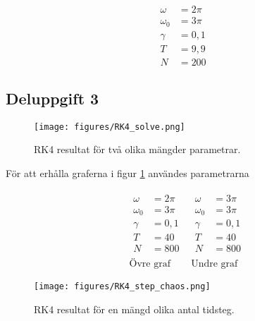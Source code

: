 \documentclass[12pt]{article}
\begin{document}
\begin{align*}
    \omega &= 2 \pi\\
    \omega_0 &= 3 \pi\\
    \gamma &= 0,1\\
    T &= 9,9\\
    N &= 200
\end{align*}

\subsection{Deluppgift 3}

\begin{figure}[H]
    \begin{small}
        \begin{center}
            \texttt{[image: figures/RK4\_solve.png]}
        \end{center}
        \caption{RK4 resultat för två olika mängder parametrar.}
        \label{fig:RK4-solve}
    \end{small}
\end{figure}

För att erhålla graferna i figur \ref{fig:RK4-solve} användes parametrarna

\begin{align*}
    &
    \begin{aligned}
        \omega &= 2 \pi\\
        \omega_0 &= 3 \pi\\
        \gamma &= 0,1\\
        T &= 40\\
        N &= 800
    \end{aligned}
    &
    \begin{aligned}
        \omega &= 3 \pi\\
        \omega_0 &= 3 \pi\\
        \gamma &= 0,1\\
        T &= 40\\
        N &= 800
    \end{aligned}\\
    &\text{Övre graf}
    &\text{Undre graf}
\end{align*}

\begin{figure}[H]
    \begin{small}
        \begin{center}
            \texttt{[image: figures/RK4\_step\_chaos.png]}
        \end{center}
        \caption{RK4 resultat för en mängd olika antal tidsteg.}
        \label{fig:RK4-stability}
    \end{small}
\end{figure}
\end{document}
